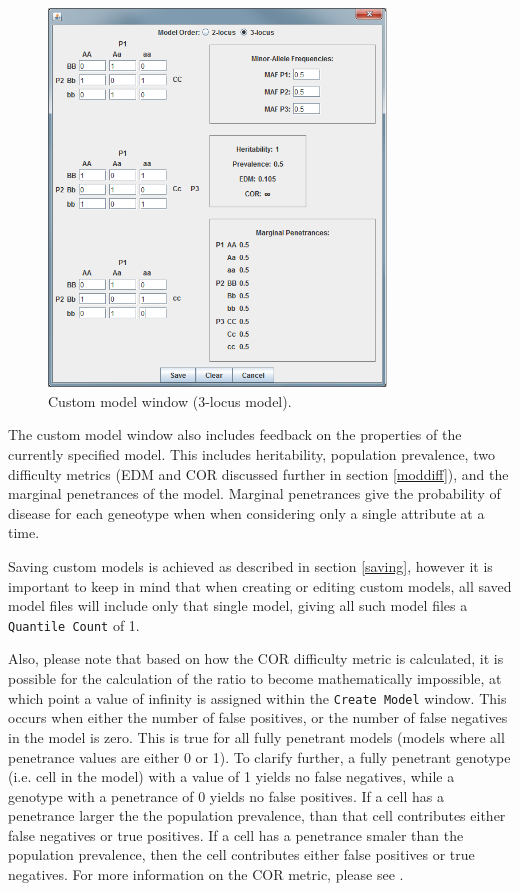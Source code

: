 \documentclass{report}
\begin{document}
\begin{figure}[t]
\centering
\includegraphics[width=0.8\textwidth]{Figure5_UG.png}%
\caption{Custom model window (3-locus model).}
\label{cust3}
\end{figure}

The custom model window also includes feedback on the properties of the currently specified model.  This includes heritability, population prevalence, two difficulty metrics (EDM and COR discussed further in section \ref{moddiff}), and the marginal penetrances of the model.  Marginal penetrances give the probability of disease for each geneotype when when considering only a single attribute at a time.

Saving custom models is achieved as described in section \ref{saving}, however it is important to keep in mind that when creating or editing custom models, all saved model files will include only that single model, giving all such model files a \texttt{Quantile Count} of 1.

Also, please note that based on how the COR difficulty metric is calculated, it is possible for the calculation of the ratio to become mathematically impossible, at which point a value of infinity is assigned within the \texttt{Create Model} window.  This occurs when either the number of false positives, or the number of false negatives in the model is zero.  This is true for all fully penetrant models (models where all penetrance values are either 0 or 1).  To clarify further, a fully penetrant genotype (i.e. cell in the model) with a value of 1 yields no false negatives, while a genotype with a penetrance of 0 yields no false positives.  If a cell has a penetrance larger the the population prevalence, than that cell contributes either false negatives or true positives.  If a cell has a penetrance smaler than the population prevalence, then the cell contributes either false positives or true negatives.  For more information on the COR metric, please see \cite{urbanowicz2012predicting}.
\end{document}
